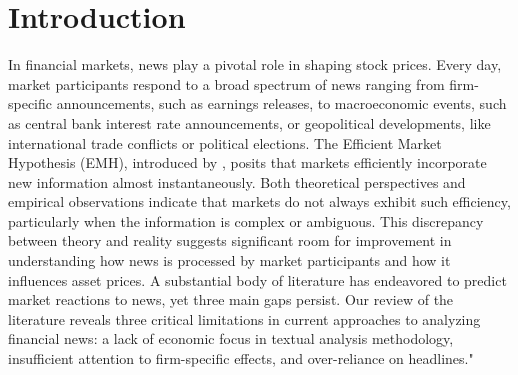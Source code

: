 \section{Introduction}
In financial markets, news play a pivotal role in shaping stock prices. Every day, market participants respond to a broad spectrum of news ranging from firm-specific announcements, such as earnings releases, to macroeconomic events, such as central bank interest rate announcements, or geopolitical developments, like international trade conflicts or political elections. The Efficient Market Hypothesis (EMH), introduced by \cite{fama1970efficient}, posits that markets efficiently incorporate new information almost instantaneously. Both theoretical perspectives and empirical observations indicate that markets do not always exhibit such efficiency, particularly when the information is complex or ambiguous. This discrepancy between theory and reality suggests significant room for improvement in understanding how news is processed by market participants and how it influences asset prices.
%
A substantial body of literature has endeavored to predict market reactions to news, yet three main gaps persist. Our review of the literature reveals three critical limitations in current approaches to analyzing financial news: a lack of economic focus in textual analysis methodology, insufficient attention to firm-specific effects, and over-reliance on headlines."


